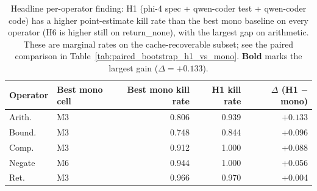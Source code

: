\begin{table}[!htbp]
\centering
\small
\caption{Headline per-operator finding: H1 (phi-4 spec + qwen-coder test + qwen-coder code) has a higher point-estimate kill rate than the best mono baseline on every operator (H6 is higher still on return\_none), with the largest gap on arithmetic. These are marginal rates on the cache-recoverable subset; see the paired comparison in Table~\ref{tab:paired_bootstrap_h1_vs_mono}. \textbf{Bold} marks the largest gain ($\Delta = +0.133$).}
\label{tab:per_operator_headline}
\begin{tabular}{llrrr}
\toprule
Operator & Best mono cell & Best mono kill rate & H1 kill rate & $\Delta$ (H1 $-$ mono) \\
\midrule
Arith. & M3 & 0.806 & 0.939 & $\mathbf{+0.133}$ \\
Bound. & M3 & 0.748 & 0.844 & +0.096 \\
Comp. & M3 & 0.912 & 1.000 & +0.088 \\
Negate & M6 & 0.944 & 1.000 & +0.056 \\
Ret. & M3 & 0.966 & 0.970 & +0.004 \\
\bottomrule
\end{tabular}
\end{table}